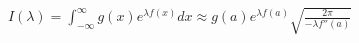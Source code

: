 \documentclass[preview]{standalone}
\begin{document}
\begin{align*}
I(\lambda) = \displaystyle \int_{-\infty}^{\infty} g(x) e^{\lambda f(x)} dx \approx g(a) \displaystyle e^{\lambda f(a)} \sqrt{\frac{2\pi}{-\lambda f''(a)}}
\end{align*}
\end{document}
